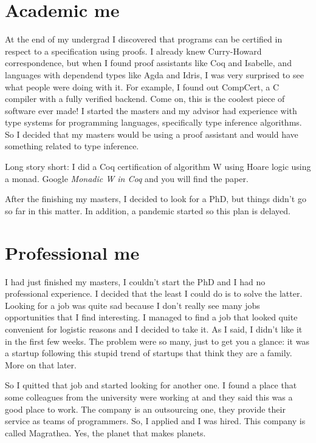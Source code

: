 \documentclass[11pt,a4paper,sans]{moderncv}
\begin{document}
\medskip

\section{Academic me}
At the end of my undergrad I discovered that programs can be certified in respect to a specification using proofs.
I already knew Curry-Howard correspondence, but when I found proof assistants like Coq and Isabelle, and languages with dependend types like Agda and Idris, I was very surprised to see what people were doing with it.
For example, I found out CompCert, a C compiler with a fully verified backend.
Come on, this is the coolest piece of software ever made!
I started the masters and my advisor had experience with type systems for programming languages, specifically type inference algorithms.
So I decided that my masters would be using a proof assistant and would have something related to type inference.

\medskip

Long story short: I did a Coq certification of algorithm W using Hoare logic using a monad.
Google \textit{Monadic W in Coq} and you will find the paper.

\medskip

After the finishing my masters, I decided to look for a PhD, but things didn't go so far in this matter.
In addition, a pandemic started so this plan is delayed.

\section{Professional me}
I had just finished my masters, I couldn't start the PhD and I had no professional experience.
I decided that the least I could do is to solve the latter.
Looking for a job was quite sad because I don't really see many jobs opportunities that I find interesting.
I managed to find a job that looked quite convenient for logistic reasons and I decided to take it.
As I said, I didn't like it in the first few weeks.
The problem were so many, just to get you a glance: it was a startup following this stupid trend of startups that think they are a family.
More on that later.

\medskip

So I quitted that job and started looking for another one.
I found a place that some colleagues from the university were working at and they said this was a good place to work.
The company is an outsourcing one, they provide their service as teams of programmers.
So, I applied and I was hired.
This company is called Magrathea.
Yes, the planet that makes planets.
\end{document}
